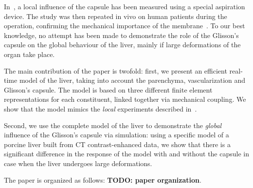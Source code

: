 \documentclass{llncs}
\newcommand{\TODO}[1]{{\color{red}\textbf{TODO: #1}}}
\begin{document}
In~\cite{Hollenstein2006}, a local influence of the capsule has been measured using a special aspiration device. The study was then repeated 
in vivo on human patients during the operation, confirming the mechanical importance of the membrane~\cite{Ahn2010,Nava2008}.
To our best knowledge, no attempt has been made to demonstrate the role of the Glisson's capsule on the global behaviour of 
the liver, mainly if large deformations of the organ take place.

The main contribution of the paper is twofold: first, we present an efficient real-time model of the liver, taking into account 
the parenchyma, vascularization and Glisson's capsule. The model is based on three different finite element representations for each constituent,
linked together via mechanical coupling. We show that the model mimics the \emph{local} experiments described in~\cite{Hollenstein2006}.
 
Second, we use the complete model of the liver to demonstrate the \emph{global} influence of the Glisson's
capsule via simulation: using a specific model of a porcine liver built from CT contrast-enhanced data, we show that there is a significant 
difference in the response of the model with and without the capsule in case when the liver undergoes large deformations. 

The paper is organized as follows: \TODO{paper organization}.
\end{document}
